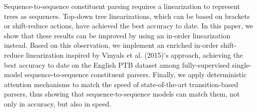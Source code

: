 Sequence-to-sequence constituent parsing requires a linearization to represent trees as sequences. Top-down tree linearizations, which can be based on brackets or shift-reduce actions, have achieved the best accuracy to date. In this paper, we show that these results can be improved by using an in-order linearization instead. Based on this observation, we implement an enriched in-order shift-reduce linearization inspired by Vinyals et al. (2015)'s approach, achieving the best accuracy to date on the English PTB dataset among fully-supervised single-model sequence-to-sequence constituent parsers. Finally, we apply deterministic attention mechanisms to match the speed of state-of-the-art transition-based parsers, thus showing that sequence-to-sequence models can match them, not only in accuracy, but also in speed.
